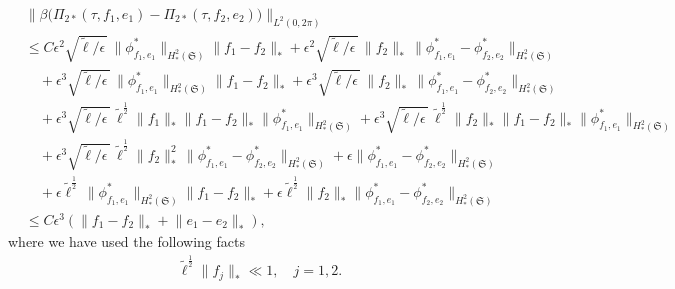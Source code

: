 \documentclass[10pt, reqno]{amsart}
\numberwithin{equation}{section}
\theoremstyle{definition}
\begin{document}
{\begin{align} \label{minus of Pi2star-in-L2-norm}
&\Big\|\beta\Big(\Pi_{2*} (\tau, f_1, e_1) - \Pi_{2*} (\tau, f_2, e_2)\Big)\Big\|_{L^2(0, 2\pi)}
\nonumber\\[2mm]
& \le C \epsilon^2 \sqrt{{\tilde\ell}/\epsilon\,}\, \big\|\phi^*_{f_1, e_1}\big\|_{H^2_*(\mathfrak S)}\big\|f_1- f_2\big\|_*
+ \epsilon^2\sqrt{{\tilde\ell}/\epsilon\,}\, \big\|f_2\big\|_* \,\big\|\phi^*_{f_1, e_1}- \phi^*_{f_2, e_2} \big\|_{H^2_*(\mathfrak S)}
\nonumber\\[2mm]
& \quad
+\epsilon^3 \sqrt{{\tilde\ell}/\epsilon\,}\, \big\|\phi^*_{f_1, e_1}\big\|_{H^2_*(\mathfrak S)}\big\|f_1- f_2\big\|_*
+ \epsilon^3\sqrt{{\tilde\ell}/\epsilon\,}\, \big\|f_2\big\|_* \,\big\|\phi^*_{f_1, e_1}- \phi^*_{f_2, e_2} \big\|_{H^2_*(\mathfrak S)}
\nonumber\\[2mm]
& \quad
+
\epsilon^3 \sqrt{{\tilde\ell}/\epsilon\,}\, {\tilde \ell}^{\frac 12}\big\|f_1\big\|_* \big\|f_1- f_2\big\|_* \big\|\phi^*_{f_1, e_1}\big\|_{H^2_*(\mathfrak S)}
+
\epsilon^3 \sqrt{{\tilde\ell}/\epsilon\,}\, {\tilde \ell}^{\frac 12}\big\|f_2\big\|_* \big\|f_1- f_2\big\|_* \big\|\phi^*_{f_1, e_1}\big\|_{H^2_*(\mathfrak S)}
\nonumber\\[2mm]
& \quad+ \epsilon^3\sqrt{{\tilde\ell}/\epsilon\,}\, {\tilde \ell}^{\frac 12} \big\|f_2\big\|_*^2\,\big\|\phi^*_{f_1, e_1}- \phi^*_{f_2, e_2} \big\|_{H^2_*(\mathfrak S)}
+\epsilon\big\|\phi^*_{f_1, e_1}- \phi^*_{f_2, e_2} \big\|_{H^2_*(\mathfrak S)}
\nonumber\\[2mm]
&\quad+ \epsilon \tilde\ell^{\frac{1}{2}} \, \big\|\phi^*_{f_1, e_1}\big\|_{H^2_*(\mathfrak S)}\big\|f_1- f_2\big\|_*
+\epsilon \tilde\ell^{\frac{1}{2}}  \big\|f_2\big\|_*\big\|\phi^*_{f_1, e_1}- \phi^*_{f_2, e_2} \big\|_{H^2_*(\mathfrak S)}
\nonumber\\[2mm]
& \le C \epsilon^{3} \left(\big\|f_1- f_2\big\|_*+ \big\|e_1- e_2\big\|_* \right),
\end{align}
where we have used the following facts
\begin{align*}
 {\tilde\ell}^{\frac 12} \|f_j\|_* \ll 1,  \quad j=1,2.
\end{align*}






}
\end{document}

